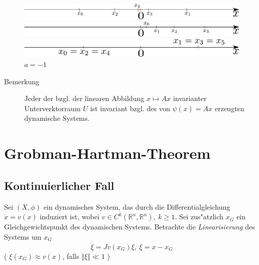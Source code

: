 \documentclass[a4paper, 13pt]{scrreprt}
\theoremstyle{definition} \newtheorem{definition}{Definition}[section]
\newcommand{\RR}{\mathbb{R}}
\begin{document}
\begin{figure}[htpb]
		\centering
		\includegraphics[width=1\textwidth]{img/lin_sys/diskret/lin_sys_1.pdf}
		\caption{$|a| < 1, \ a < 0$}

		\includegraphics[width=1\textwidth]{img/lin_sys/diskret/lin_sys_2.pdf}
		\caption{$|a| > 1, \ a > 1$}

		\includegraphics[width=1\textwidth]{img/lin_sys/diskret/lin_sys_3.pdf}
		\caption{$a = -1$}
\end{figure}

\begin{description}
\item[Bemerkung]
	Jeder der bzgl. der linearen Abbildung \(x\mapsto Ax \) invarianter Unterverktorraum \(U\) ist invariant bzgl. des von \(\psi(x) = Ax \) erzeugten dynamische Systems.
\end{description}


\chapter{Grobman-Hartman-Theorem}

\section{Kontinuierlicher Fall}
Sei $(X,\phi)$ ein dynamisches System, das durch die Differentialgleichung ${\dot x = v(x)}$ induziert ist, wobei $v \in C^k(\RR^n, \RR^n), \ k \geq 1$. Sei zus"atzlich  $x_G$ ein Gleichgewichtspunkt des dynamischen Systems. Betrachte die \emph{Linearisierung} des Systems um $x_G$ 
\[\dot{\xi}=Jv(x_G)\xi, \ \xi =x-x_G\] 
( $\dot{\xi}(x_G)\approx v(x)$, falls $\Vert\xi\Vert\ll 1$ )
\end{document}
